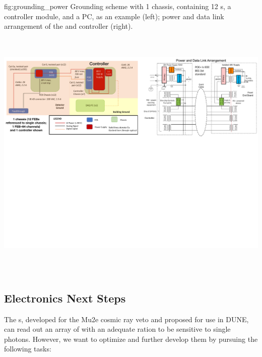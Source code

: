 \begin{dunefigure}
 {fig:grounding_power}
 {Grounding scheme with 1 chassis, containing 12 s, a controller module, and a  PC, as an example (left); power and data link arrangement of the  and controller (right).}
\includegraphics[height=5.0in]{graphics/pds-grounding-power.pdf} 
\vspace{-7.1cm}
\end{dunefigure}

\subsection{Electronics Next Steps}
\label{subsec:pds-fe-next}

The s, developed for the Mu2e cosmic ray veto and proposed for use in DUNE, can read out an array of  with an adequate  ration to be sensitive to single photons. However, we want to optimize and further develop them by pursuing the following tasks:

